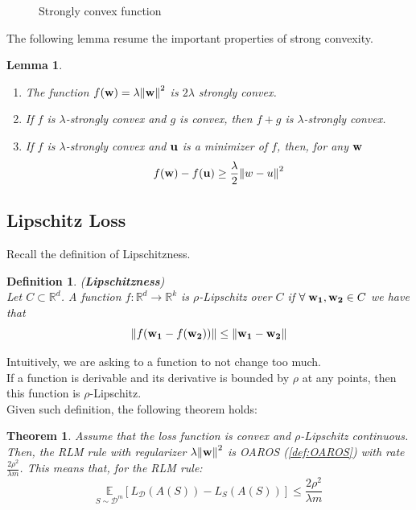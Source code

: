 \documentclass[12pt]{report}
\theoremstyle{plain}
\newtheorem{theorem}{Theorem}[chapter]
\newtheorem{definition}{Definition}[chapter]
\newtheorem{lemma}{Lemma}[chapter]
\newcommand\mcl[1]{\mathcal{#1}}
\begin{document}
\begin{flushleft}
\begin{figure}[!h]
	\caption{Strongly convex function}
	\label{fig:lambda_convex}
\end{figure}
The following lemma resume the important properties of strong convexity.
\begin{lemma}
	\begin{enumerate}
		\item The function $f(\vb{w})=\lambda\norm{\vb{w}}^2$ is $2\lambda$ strongly convex.
		\item If $f$ is $\lambda$-strongly convex and $g$ is convex, then $f+g$ is $\lambda$-strongly convex.
		\item If $f$ is $\lambda$-strongly convex and $\vb{u}$ is a minimizer of $f$, then, for any $\vb{w}$
		\[ f(\vb{w})-f(\vb{u})\geq\frac{\lambda}{2}\norm{w-u}^2 \]
	\end{enumerate}
\end{lemma}


\subsection{Lipschitz Loss}
Recall the definition of Lipschitzness.
\begin{definition} (\textbf{Lipschitzness})\\
	Let $C\subset\mathds{R}^d$. A function $f:\mathds{R}^d\to\mathds{R}^k$ is $\rho$-Lipschitz over $C$ if $\forall\;\vb{w_1},\vb{w_2}\in C$ we have that
	\[ \norm{f(\vb{w_1}-f(\vb{w_2}))}\leq\norm{\vb{w_1}-\vb{w_2}} \]
\end{definition}
Intuitively, we are asking to a function to not change too much.\\
If a function is derivable and its derivative is bounded by $\rho$ at any points, then this function is $\rho$-Lipschitz.\\
Given such definition, the following theorem holds:
\begin{theorem}
	Assume that the loss function is convex and $\rho$-Lipschitz continuous. Then, the RLM rule with regularizer $\lambda\norm{\vb{w}}^2$ is OAROS (\ref{def:OAROS}) with rate $\frac{2\rho^2}{\lambda m}$. This means that, for the RLM rule:
	\[ \underset{S\sim\mcl{D}^m}{\mathds{E}}\left[L_\mcl{D}(A(S))-L_S(A(S))\right]\leq\frac{2\rho^2}{\lambda m} \]
\end{theorem}


\end{flushleft}
\end{document}
